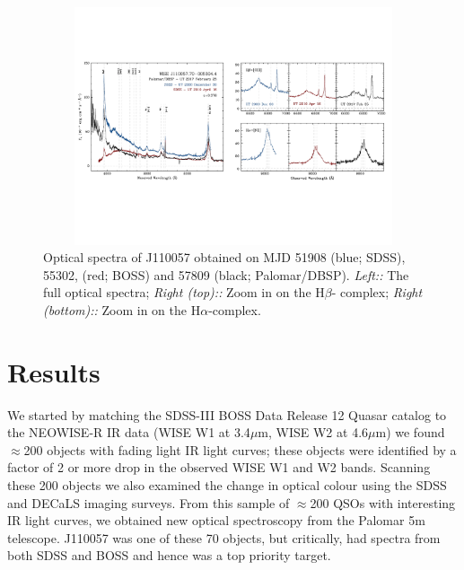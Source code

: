\documentclass{nature}
\begin{document}
\begin{figure}
  \includegraphics[width=16.00cm, height=7.00cm, trim=0.0cm 0.0cm 0.0cm 0.0cm, clip]
  {../plots/spectra/J110057_spectra_wBalmers.pdf}
  \centering
  \caption[]{
Optical spectra of J110057 obtained on MJD 51908 (blue; SDSS), 55302,
(red; BOSS) and 57809 (black; Palomar/DBSP).  {\it Left::} The full
optical spectra; {\it Right (top)::} Zoom in on the H$\beta$-\oiii
complex; {\it Right (bottom)::} Zoom in on the H$\alpha$-\nii complex.
}
  \label{fig:J110057_spectra}
\end{figure}
\section{Results}  
We started by matching the SDSS-III BOSS Data Release 12 Quasar
catalog \cite[DR12Q; ][]{Paris17)} to the NEOWISE-R IR data (WISE W1
at 3.4$\mu$m, WISE W2 at 4.6$\mu$m) we found $\approx$200 objects with
fading light IR light curves; these objects were identified by a
factor of 2 or more drop in the observed WISE W1 and W2 bands.
Scanning these 200 objects we also examined the change in optical
colour using the SDSS and DECaLS imaging surveys. From this sample of
$\approx$200 QSOs with interesting IR light curves, we obtained new
optical spectroscopy from the Palomar 5m telescope.  J110057 was one
of these 70 objects, but critically, had spectra from both SDSS and
BOSS and hence was a top priority target.
\end{document}
